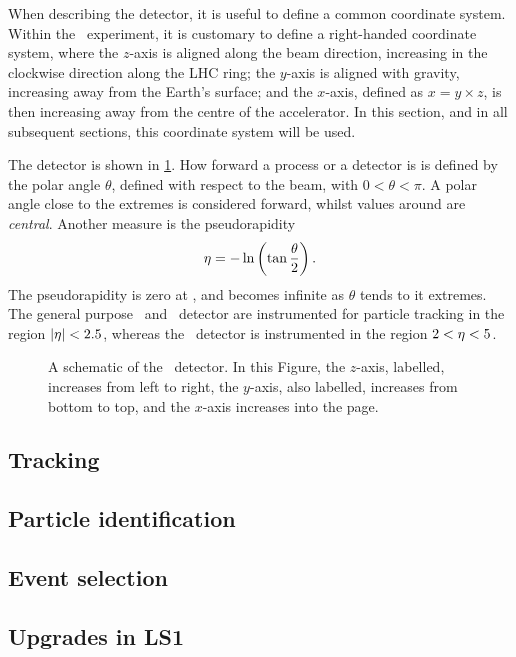 When describing the detector, it is useful to define a common coordinate 
system.
Within the \lhcb\ experiment, it is customary to define a right-handed 
coordinate system, where the $z$-axis is aligned along the beam direction, 
increasing in the clockwise direction along the \ac{LHC} ring; the $y$-axis is 
aligned with gravity, increasing away from the Earth's surface; and the 
$x$-axis, defined as $x = y \times z$, is then increasing away from the centre 
of the accelerator.
In this section, and in all subsequent sections, this coordinate system will be 
used.

The detector is shown in \cref{fig:intro:lhcb:detector}.
How forward a process or a detector is is defined by the polar angle $\theta$, 
defined with respect to the beam, with $0 < \theta < \pi$.
A polar angle close to the extremes is considered forward, whilst values around 
 are \emph{central}.
Another measure is the pseudorapidity
\begin{equation}
  \eta = -\ln\left(\tan{\frac{\theta}{2}}\right).
  \label{eqn:intro:lhcb:pseudorapidity}
\end{equation}
The pseudorapidity is zero at , and becomes infinite as $\theta$ 
tends to it extremes.
The general purpose \atlas\ and \cms\ detector are instrumented for particle 
tracking in the region $|\eta| < 2.5$, whereas the \lhcb\ detector is 
instrumented in the region $2 < \eta < 5$.

\begin{figure}
  \centering
  
  \caption{%
    A schematic of the \lhcb\ detector.
    In this Figure, the $z$-axis, labelled, increases from left to right, the 
    $y$-axis, also labelled, increases from bottom to top, and the $x$-axis 
    increases into the page.
  }
  \label{fig:intro:lhcb:detector}
\end{figure}

\subsection{Tracking}
\label{chap:intro:lhcb:detector:tracking}

\subsection{Particle identification}
\label{chap:intro:lhcb:detector:pid}

\subsection{Event selection}
\label{chap:intro:lhcb:detector:trigger}

\subsection{Upgrades in \acl{LS1}}
\label{chap:intro:lhcb:detector:upgrades}
